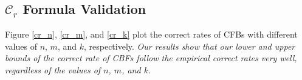 \vspace{-0.05in}
\subsection{$\mathcal{C}_r$ Formula Validation}
\vspace{-0.02in}
Figure \ref{cr_n}, \ref{cr_m}, and \ref{cr_k} plot the correct rates of CFBs with different values of $n$, $m$, and $k$, respectively. 
\textit{Our results show that our lower and upper bounds of the correct rate of CBFs follow the empirical correct rates very well, regardless of the values of $n$, $m$, and $k$.}

 
%
%
%
